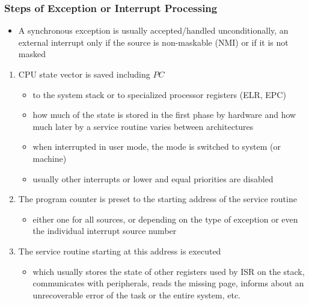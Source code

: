 \documentclass{beamer}
\begin{document}
\begin{frame}
\frametitle{Steps of Exception or Interrupt Processing}

\begin{itemize}
 \item A synchronous exception is usually accepted/handled unconditionally,
an external interrupt only if the source is non-maskable (NMI) or if it is not masked
\end{itemize}

\begin{enumerate}
 \item CPU state vector is saved including $PC$
 \begin{itemize}
  \item to the system stack or to specialized processor registers (ELR, EPC)
  \item how much of the state is stored in the first phase by hardware and how much later by a service routine varies between architectures
  \item when interrupted in user mode, the mode is switched to system (or machine)
  \item usually other interrupts or lower and equal priorities are disabled
 \end{itemize}
 \item The program counter is preset to the starting address of the service routine
 \begin{itemize}
  \item either one for all sources, or depending on the type of exception or even the individual interrupt source number
 \end{itemize}
 \item The service routine starting at this address is executed
 \begin{itemize}
  \item which usually stores the state of other registers used by ISR on the stack, communicates with peripherals, reads the missing page, informs about an unrecoverable error of the task or the entire system, etc.
 \end{itemize}
\end{enumerate}
\end{frame}
\end{document}
